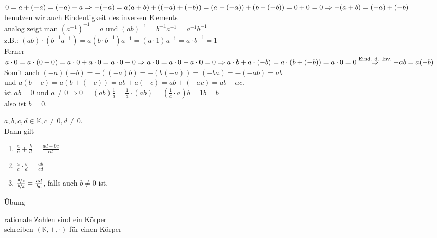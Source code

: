 \documentclass[../ana1.tex]{subfiles}
\begin{document}
\begin{bew}
	$0 = a + (-a) = (-a) + a\\
		\Rightarrow -(-a) = a\\
		(a+b) + ((-a)+(-b)) = (a+(-a))+(b+(-b))=0+0=0\\
		\Rightarrow -(a+b)=(-a)+(-b)$\\
	benutzen wir auch Eindeutigkeit des inversen Elements\\
	analog zeigt man $(a^{-1})^{-1} = a$ und $(ab)^{-1}= b^{-1}a^{-1}=a^{-1}b^{-1}$\\
	z.B.: $(ab)\cdot (b^{-1}a^{-1})=a(b\cdot b^{-1}) a^{-1} = (a\cdot 1)a^{-1} = a\cdot b^{-1}=1$\\
	Ferner $a\cdot 0 = a\cdot(0+0)=a\cdot 0 + a\cdot 0 = a\cdot 0 + 0\\
		\Rightarrow a\cdot 0 = a\cdot 0 - a\cdot 0 = 0\\
		\Rightarrow a\cdot b + a\cdot (-b) = a\cdot (b+(-b)) = a\cdot 0=0\\
		\overset{\text{Eind. d. Inv.}}{\Rightarrow} -ab=a(-b)$\\
	Somit auch $(-a)(-b) = -((-a)b) = -(b(-a)) = (-ba) = -(-ab) = ab$\\
	und $a(b-c) = a(b+(-c))=ab+a(-c)=ab+(-ac)=ab-ac$.\\
	ist $ab = 0$ und $a\neq 0 \Rightarrow 0=(ab)\frac{1}{a}=\frac{1}{a}\cdot (ab)=(\frac{1}{a}\cdot a)b = 1b = b$\\also ist $b=0$.
\end{bew}
\begin{satz}[Bruchrechnen]
	$a,b,c,d\in\mathbb{K}, c\neq 0, d\neq 0$.\\
	Dann gilt
	\begin{enumerate}
		\item $\frac{a}{c}+\frac{b}{d}=\frac{ad+bc}{cd}$
		\item $\frac{a}{c}\cdot\frac{b}{d}=\frac{ab}{cd}$
		\item $\frac{\nicefrac{a}{c}}{\nicefrac{b}{d}} = \frac{ad}{bc}$, falls auch $b\neq 0$ ist.
	\end{enumerate}
\end{satz}
\begin{bew}
	Übung
\end{bew}
\begin{bsp}
	rationale Zahlen sind ein Körper\\
	schreiben $(\mathbb{K},+,\cdot)$ für einen Körper
\end{bsp}
\end{document}
